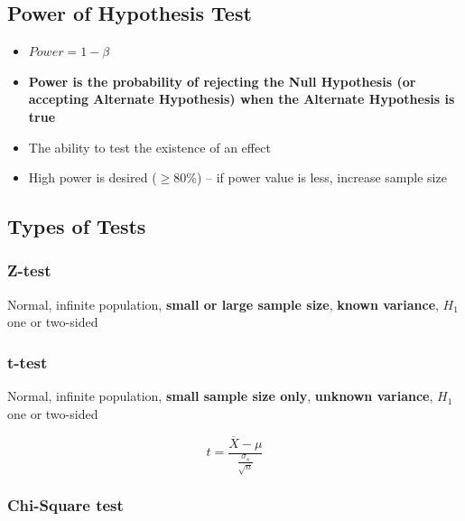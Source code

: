 \documentclass{article}
\begin{document}
\subsection{Power of Hypothesis Test}

\begin{itemize}
    \item $Power = 1 - \beta$
    \item \textbf{Power is the probability of rejecting the Null Hypothesis (or accepting Alternate Hypothesis) when the Alternate Hypothesis is true}
    \item The ability to test the existence of an effect
    \item High power is desired ($\ge$80\%) -- if power value is less, increase sample size
\end{itemize}

\subsection{Types of Tests}

\subsubsection{Z-test}

Normal, infinite population, \textbf{small or large sample size}, \textbf{known variance}, $H_1$ one or two-sided

\subsubsection{t-test}

Normal, infinite population, \textbf{small sample size only}, \textbf{unknown variance}, $H_1$ one or two-sided

\begin{equation}
            t = \frac{\overline{X} - \mu}{\frac{\sigma_s}{\sqrt{n}}}
\end{equation}

\subsubsection{Chi-Square test}
\end{document}
